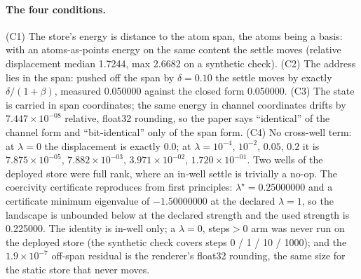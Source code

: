 \documentclass{article} %
\newcommand{\sci}[2]{\ensuremath{#1\times10^{#2}}}
\begin{document}
\paragraph{The four conditions.} (C1) The store's energy is distance to the atom span, the atoms
being a basis: with an atoms-as-points energy on the same content the settle moves (relative
displacement median 1.7244, max 2.6682 on a synthetic check). (C2) The address lies in the span:
pushed off the span by $\delta=0.10$ the settle moves by exactly $\delta/(1+\beta)$, measured
0.050000 against the closed form 0.050000. (C3) The state is carried in span coordinates; the same
energy in channel coordinates drifts by \sci{7.447}{-08} relative, float32 rounding, so the paper
says ``identical'' of the channel form and ``bit-identical'' only of the span form. (C4) No
cross-well term: at $\lambda=0$ the displacement is exactly 0.0; at
$\lambda=10^{-4}$, $10^{-2}$, $0.05$, $0.2$ it is \sci{7.875}{-05}, \sci{7.882}{-03},
\sci{3.971}{-02}, \sci{1.720}{-01}. Two wells of the deployed store were full rank, where an in-well
settle is trivially a no-op. The coercivity certificate reproduces from first principles:
$\lambda^\star=0.25000000$ and a certificate minimum eigenvalue of $-1.50000000$ at the declared
$\lambda=1$, so the landscape is unbounded below at the declared strength and the used strength is
0.225000. %
The identity is in-well only; a $\lambda=0$, steps$>0$ arm was never run on the deployed store (the
synthetic check covers steps 0 / 1 / 10 / 1000); and the \sci{1.9}{-7} off-span residual is the
renderer's float32 rounding, the same size for the static store that never moves.
\end{document}
